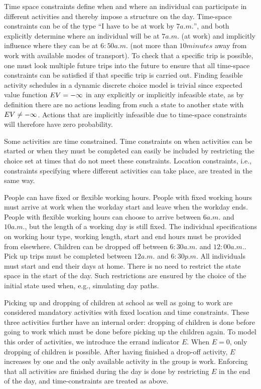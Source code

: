 Time space constraints define when and where an individual can participate in different activities and thereby impose a structure on the day. Time-space constraints can be of the type ``I have to be at work by $7\unit{a.m.}$'', and both explicitly determine where an individual will be at $7\unit{a.m.}$ (at work) and implicitly influence where they can be at $6:50\unit{a.m.}$ (not more than $10\unit{minutes}$ away from work with available modes of transport). To check that a specific trip is possible, one must look multiple future trips into the future to ensure that all time-space constraints can be satisfied if that specific trip is carried out. Finding feasible activity schedules in a dynamic discrete choice model is trivial since expected value function $EV = -\infty$ in any explicitly or implicitly infeasible state, as by definition there are no actions leading from such a state to another state with $EV \neq -\infty$. Actions that are implicitly infeasible due to time-space constraints will therefore have zero probability.%

Some activities are time constrained. Time constraints on when activities can be started or when they must be completed can easily be included by restricting the choice set at times that do not meet these constraints. Location constraints, i.e., constraints specifying where different activities can take place, are treated in the same way.

People can have fixed or flexible working hours. People with fixed working hours must arrive at work when the workday start and leave when the workday ends. %
People with flexible working hours can choose to arrive between $6\unit{a.m.}$ and $10\unit{a.m.}$, but the length of a working day is still fixed. The individual specifications on working hour type, working length, start and end hours must be provided from elsewhere. Children can be dropped off between $6:30\unit{a.m.}$ and $12:00\unit{a.m.}$. Pick up trips must be completed between $12\unit{a.m.}$ and $6:30\unit{p.m.}$
All individuals must start and end their days at home. There is no need to restrict the state space in the start of the day. Such restrictions are ensured by the choice of the initial state used when, e.g., simulating day paths.


Picking up and dropping of children at school as well as going to work are considered mandatory activities with fixed location and time constraints. These three activities further have an internal order: dropping of children is done before going to work which must be done before picking up the children again. To model this order of activities, we introduce the errand indicator $E$. When $E=0$, only dropping of children is possible. After having finished a drop-off activity, $E$ increases by one and the only available activity in the group is work. Enforcing that all activities are finished during the day is done by restricting $E$ in the end of the day, and time-constraints are treated as above.

